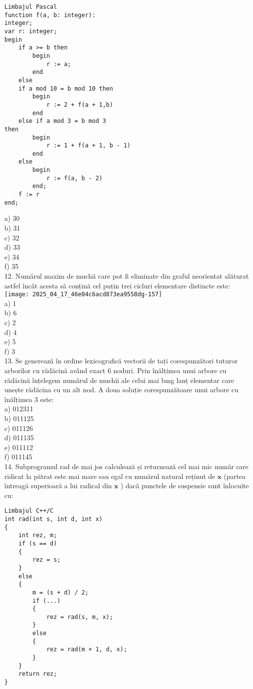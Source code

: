 \begin{verbatim}
Limbajul Pascal
function f(a, b: integer):
integer;
var r: integer;
begin
    if a >= b then
        begin
            r := a;
        end
    else
    if a mod 10 = b mod 10 then
        begin
            r := 2 + f(a + 1,b)
        end
    else if a mod 3 = b mod 3
then
        begin
            r := 1 + f(a + 1, b - 1)
        end
    else
        begin
            r := f(a, b - 2)
        end;
    f := r
end;
\end{verbatim}

a) 30\\
b) 31\\
c) 32\\
d) 33\\
e) 34\\
f) 35\\
12. Numărul maxim de muchii care pot fi eliminate din graful neorientat alăturat astfel încât acesta să conțină cel puțin trei cicluri elementare distincte este:\\
\texttt{[image: 2025\_04\_17\_46e04c6acd873ea9558dg-157]}\\
a) 1\\
b) 6\\
c) 2\\
d) 4\\
e) 5\\
f) 3\\
13. Se generează în ordine lexicografică vectorii de tați corespunzători tuturor arborilor cu rădăcină având exact 6 noduri. Prin înălțimea unui arbore cu rădăcină înțelegem numărul de muchii ale celui mai lung lanț elementar care unește rădăcina cu un alt nod. A doua soluție corespunzătoare unui arbore cu înălțimea 3 este:\\
a) 012311\\
b) 011125\\
c) 011126\\
d) 011135\\
e) 011112\\
f) 011145\\
14. Subprogramul rad de mai jos calculează și returnează cel mai mic număr care ridicat la pătrat este mai mare sau egal cu numărul natural reținut de $\mathbf{x}$ (partea întreagă superioară a lui radical din $\mathbf{x}$ ) dacă punctele de suspensie sunt înlocuite cu:

\begin{verbatim}
Limbajul C++/C
int rad(int s, int d, int x)
{
    int rez, m;
    if (s == d)
    {
        rez = s;
    }
    else
    {
        m = (s + d) / 2;
        if (...)
        {
            rez = rad(s, m, x);
        }
        else
        {
            rez = rad(m + 1, d, x);
        }
    }
    return rez;
}
\end{verbatim}

